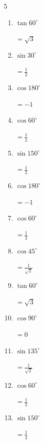 \begin{multicols}{5}
\begin{enumerate}
  \item $\displaystyle \tan{60^\circ}$

        $\displaystyle =\sqrt{3}$

  \item $\displaystyle \sin{30^\circ}$

        $\displaystyle =\frac{1}{2}$

  \item $\displaystyle \cos{180^\circ}$

        $\displaystyle =-1$

  \item $\displaystyle \cos{60^\circ}$

        $\displaystyle =\frac{1}{2}$

  \item $\displaystyle \sin{150^\circ}$

        $\displaystyle =\frac{1}{2}$

  \item $\displaystyle \cos{180^\circ}$

        $\displaystyle =-1$

  \item $\displaystyle \cos{60^\circ}$

        $\displaystyle =\frac{1}{2}$

  \item $\displaystyle \cos{45^\circ}$

        $\displaystyle =\frac{1}{\sqrt{2}}$

  \item $\displaystyle \tan{60^\circ}$

        $\displaystyle =\sqrt{3}$

  \item $\displaystyle \cos{90^\circ}$

        $\displaystyle =0$

  \item $\displaystyle \sin{135^\circ}$

        $\displaystyle =\frac{1}{\sqrt{2}}$

  \item $\displaystyle \cos{60^\circ}$

        $\displaystyle =\frac{1}{2}$

  \item $\displaystyle \sin{150^\circ}$

        $\displaystyle =\frac{1}{2}$

\columnbreak %


\end{enumerate}
\end{multicols}
